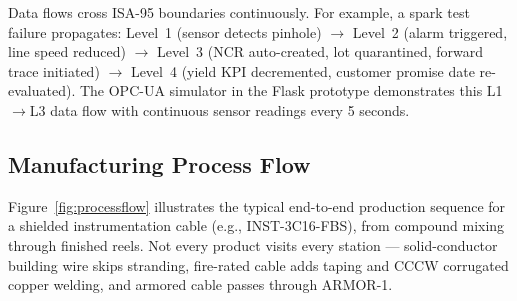 \documentclass[11pt]{article}
\begin{document}
Data flows cross ISA-95 boundaries continuously. For example, a spark test failure propagates: Level~1 (sensor detects pinhole) $\to$ Level~2 (alarm triggered, line speed reduced) $\to$ Level~3 (NCR auto-created, lot quarantined, forward trace initiated) $\to$ Level~4 (yield KPI decremented, customer promise date re-evaluated). The OPC-UA simulator in the Flask prototype demonstrates this L1$\to$L3 data flow with continuous sensor readings every 5 seconds.


\subsection{Manufacturing Process Flow}

Figure~\ref{fig:processflow} illustrates the typical end-to-end production sequence for a shielded instrumentation cable (e.g., INST-3C16-FBS), from compound mixing through finished reels.  Not every product visits every station --- solid-conductor building wire skips stranding, fire-rated cable adds taping and CCCW corrugated copper welding, and armored cable passes through ARMOR-1.
\end{document}
